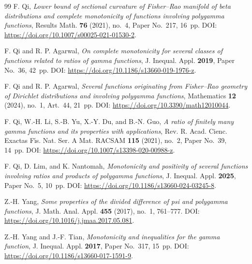 \documentclass[reqno]{amsart}%
\theoremstyle{plain}
\theoremstyle{remark}
\begin{document}
\begin{thebibliography}{99}
F. Qi, \textit{Lower bound of sectional curvature of Fisher--Rao manifold of beta distributions and complete monotonicity of functions involving polygamma functions}, Results Math. \textbf{76} (2021), no.~4, Paper No.~217, 16~pp. DOI: \url{https://doi.org/10.1007/s00025-021-01530-2}.

F. Qi and R. P. Agarwal, \textit{On complete monotonicity for several classes of functions related to ratios of gamma functions}, J. Inequal. Appl. \textbf{2019}, Paper No.~36, 42~pp. DOI: \url{https://doi.org/10.1186/s13660-019-1976-z}.

F. Qi and R. P. Agarwal, \textit{Several functions originating from Fisher--Rao geometry of Dirichlet distributions and involving polygamma functions}, Mathematics \textbf{12} (2024), no.~1, Art.~44, 21~pp. DOI: \url{https://doi.org/10.3390/math12010044}.

F. Qi, W.-H. Li, S.-B. Yu, X.-Y. Du, and B.-N. Guo, \textit{A ratio of finitely many gamma functions and its properties with applications}, Rev. R. Acad. Cienc. Exactas F\'{\i}s. Nat. Ser. A Mat. RACSAM \textbf{115} (2021), no.~2, Paper No.~39, 14~pp. DOI: \url{https://doi.org/10.1007/s13398-020-00988-z}.

F. Qi, D. Lim, and K. Nantomah, \emph{Monotonicity and positivity of several functions involving ratios and products of polygamma functions}, J. Inequal. Appl. \textbf{2025}, Paper No.~5, 10~pp. DOI: \url{https://doi.org/10.1186/s13660-024-03245-8}.

Z.-H. Yang, \emph{Some properties of the divided difference of psi and polygamma functions}, J. Math. Anal. Appl. \textbf{455} (2017), no.~1, 761\nobreakdash--777. DOI: \url{https://doi.org/10.1016/j.jmaa.2017.05.081}.

Z.-H. Yang and J.-F. Tian, \emph{Monotonicity and inequalities for the gamma function}, J. Inequal. Appl. \textbf{2017}, Paper No.~317, 15~pp. DOI: \url{https://doi.org/10.1186/s13660-017-1591-9}.

\end{thebibliography}
\end{document}
